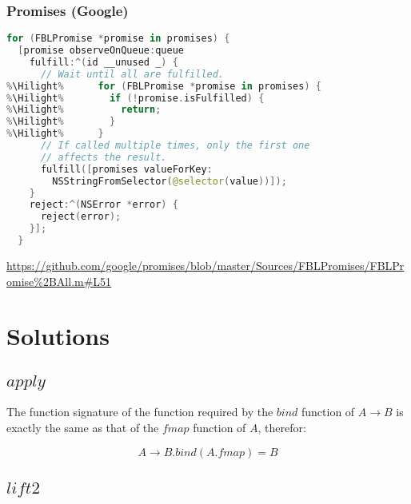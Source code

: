 \documentclass{shpdocumentation}
\begin{document}
\clearpage

\subsubsection{Promises (Google)}

\begin{lstlisting}[language=swift,escapechar=\%]
for (FBLPromise *promise in promises) {
  [promise observeOnQueue:queue
    fulfill:^(id __unused _) {
      // Wait until all are fulfilled.
%\Hilight%      for (FBLPromise *promise in promises) {
%\Hilight%        if (!promise.isFulfilled) {
%\Hilight%          return;
%\Hilight%        }
%\Hilight%      }
      // If called multiple times, only the first one
      // affects the result.
      fulfill([promises valueForKey:
        NSStringFromSelector(@selector(value))]);
    }
    reject:^(NSError *error) {
      reject(error);
    }];
  }
\end{lstlisting}
\url{https://github.com/google/promises/blob/master/Sources/FBLPromises/FBLPromise%2BAll.m#L51}

%
%
%


\clearpage

\section{Solutions} \label{solutions}

\subsection{$apply$} \label{solution-apply}
The function signature of the function required by the $bind$ function of $\boxed{A \to B}$ is exactly the same as that of the $fmap$ function of $\boxed{A}$, therefor:

\[ \boxed{A \to B}.bind(\boxed{A}.fmap) = \boxed{B} \]

\subsection{$lift2$} \label{solution-lift}
\end{document}
